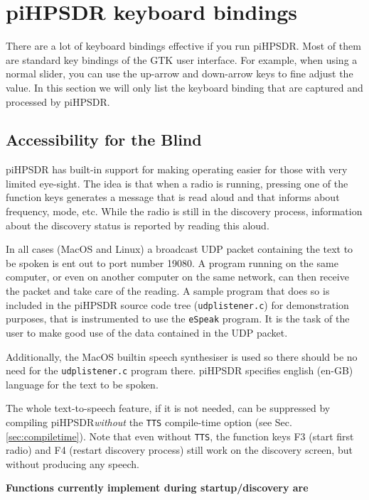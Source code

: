 \documentclass[12pt]{book}
\def\pH{pi\-HPSDR\xspace}
\begin{document}
\chapter[Keyboard bindings]{\pH keyboard bindings}

There are a lot of keyboard bindings effective if you run \pH. Most of them are
standard key bindings of the GTK user interface. For example, when using a normal
slider, you can use the up-arrow and down-arrow keys to fine adjust the value. In this
section we will only list the keyboard binding that are captured and processed by \pH.

\section{Accessibility for the Blind}
\label{sec:accessibility}
\pH has built-in support for making operating easier for those with very limited
eye-sight. The idea is that when a radio is running, pressing one of the function keys generates
a message that
is read aloud and that informs about frequency, mode, etc. While the radio is still in the
discovery process, information about the discovery status is reported by reading this aloud.

In all cases (MacOS and Linux) a broadcast UDP packet containing the text to be spoken
is ent out to port number 19080. A program running on the same computer, or even on another
computer on the same network, can
then receive the packet and take care of the reading. A sample program that does so
is included in the \pH source code tree (\texttt{udplistener.c}) for demonstration purposes,
that is instrumented to use  the \texttt{eSpeak} program. It is the task of the user to
make good use of the data contained in the UDP packet.

Additionally, the MacOS builtin speech synthesiser is used so there should be no need
for the \texttt{udplistener.c} program there. \pH specifies english (en-GB)
language for the text to be spoken.

The whole text-to-speech feature, if it is not needed, can be suppressed by compiling
\pH \textit{without} the \texttt{TTS} compile-time option (see Sec. \ref{sec:compiletime}).
Note that even without \texttt{TTS},
the function keys F3 (start first radio) and F4 (restart
discovery process) still work on the discovery screen, but without producing any speech.

\textbf{Functions currently implement during startup/discovery are}
\end{document}
